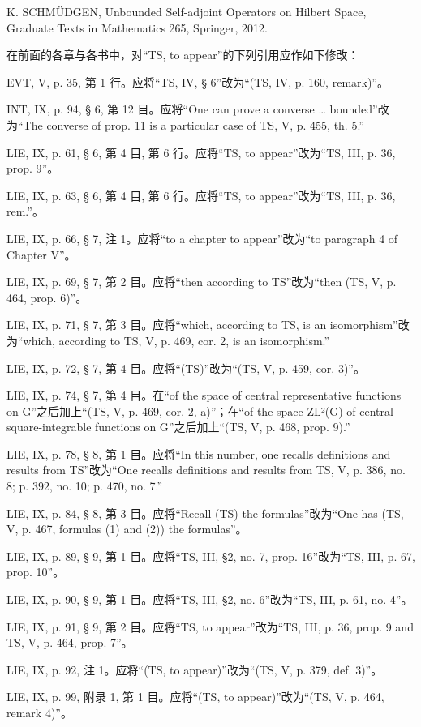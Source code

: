 K. SCHMÜDGEN, Unbounded Self-adjoint Operators on Hilbert Space, Graduate Texts in Mathematics 265, Springer, 2012.

在前面的各章与各书中，对“TS, to appear”的下列引用应作如下修改：

EVT, V, p. 35, 第 1 行。应将“TS, IV, § 6”改为“(TS, IV, p. 160, remark)”。

INT, IX, p. 94, § 6, 第 12 目。应将“One can prove a converse \ldots{} bounded”改为“The converse of prop. 11 is a particular case of TS, V, p. 455, th. 5.”

LIE, IX, p. 61, § 6, 第 4 目, 第 6 行。应将“TS, to appear”改为“TS, III, p. 36, prop. 9”。

LIE, IX, p. 63, § 6, 第 4 目, 第 6 行。应将“TS, to appear”改为“TS, III, p. 36, rem.”。

LIE, IX, p. 66, § 7, 注 1。应将“to a chapter to appear”改为“to paragraph 4 of Chapter V”。

LIE, IX, p. 69, § 7, 第 2 目。应将“then according to TS”改为“then (TS, V, p. 464, prop. 6)”。

LIE, IX, p. 71, § 7, 第 3 目。应将“which, according to TS, is an isomorphism”改为“which, according to TS, V, p. 469, cor. 2, is an isomorphism.”

LIE, IX, p. 72, § 7, 第 4 目。应将“(TS)”改为“(TS, V, p. 459, cor. 3)”。

LIE, IX, p. 74, § 7, 第 4 目。在“of the space of central representative functions on G”之后加上“(TS, V, p. 469, cor. 2, a)”；在“of the space ZL²(G) of central square-integrable functions on G”之后加上“(TS, V, p. 468, prop. 9).”

LIE, IX, p. 78, § 8, 第 1 目。应将“In this number, one recalls definitions and results from TS”改为“One recalls definitions and results from TS, V, p. 386, no. 8; p. 392, no. 10; p. 470, no. 7.”

LIE, IX, p. 84, § 8, 第 3 目。应将“Recall (TS) the formulas”改为“One has (TS, V, p. 467, formulas (1) and (2)) the formulas”。

LIE, IX, p. 89, § 9, 第 1 目。应将“TS, III, §2, no. 7, prop. 16”改为“TS, III, p. 67, prop. 10”。

LIE, IX, p. 90, § 9, 第 1 目。应将“TS, III, §2, no. 6”改为“TS, III, p. 61, no. 4”。

LIE, IX, p. 91, § 9, 第 2 目。应将“TS, to appear”改为“TS, III, p. 36, prop. 9 and TS, V, p. 464, prop. 7”。

LIE, IX, p. 92, 注 1。应将“(TS, to appear)”改为“(TS, V, p. 379, def. 3)”。

LIE, IX, p. 99, 附录 1, 第 1 目。应将“(TS, to appear)”改为“(TS, V, p. 464, remark 4)”。

